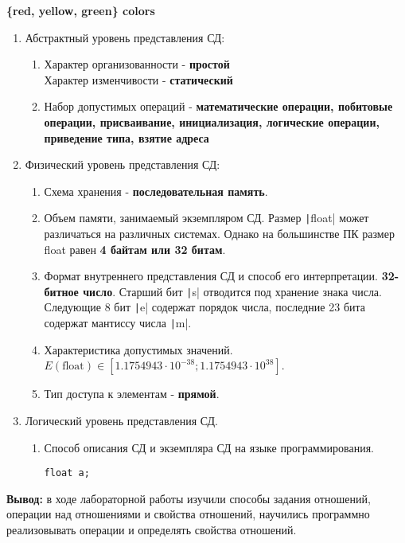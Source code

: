 \documentclass[a4paper,14pt]{extarticle}
\begin{document}
\begin{enumerate}
		  \textbf{\{red, yellow, green\} colors}
	      \begin{enumerate}[label*=\arabic*.]
		      \item Абстрактный уровень представления СД:

		            \begin{enumerate}[label*=\arabic*.]
			            \item Характер организованности - \textbf{простой}\\
			                  Характер изменчивости - \textbf{статический}
			            \item Набор допустимых операций - \textbf{математические операции, побитовые операции, присваивание, инициализация, логические операции,
				                  приведение типа, взятие адреса}
		            \end{enumerate}

		      \item Физический уровень представления СД:

		            \begin{enumerate}[label*=\arabic*.]
			            \item Схема хранения - \textbf{последовательная память}.
			            \item Объем памяти, занимаемый экземпляром СД.
			                  Размер \texttt|float| может различаться на различных системах.
			                  Однако на большинстве ПК размер float равен \textbf{4 байтам или 32 битам}.
			            \item Формат внутреннего представления СД и способ его интерпретации.
			                  \textbf{32-битное число}. Старший бит \texttt|s| отводится под хранение знака числа.
			                  Следующие 8 бит \texttt|e| содержат порядок числа, последние 23 бита содержат мантиссу числа \texttt|m|.
			            \item Характеристика допустимых значений.\\
			                  $E(\text{float}) \in [1.1754943\cdot10^{-38}; 1.1754943\cdot10^{38}]$.
			            \item Тип доступа к элементам - \textbf{прямой}.
		            \end{enumerate}

		      \item Логический уровень представления СД.
		            \begin{enumerate}[label*=\arabic*.]
			            \item Способ описания СД и экземпляра СД на языке программирования.
			                  \begin{verbatim}
float a;
					  \end{verbatim}
		            \end{enumerate}
	      \end{enumerate}
\end{enumerate}
\textbf{Вывод: } в ходе лабораторной работы изучили способы задания отношений, операции над отношениями и свойства отношений, научились программно реализовывать операции и определять свойства отношений.
\end{document}
